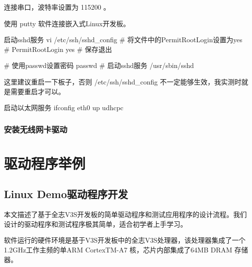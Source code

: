 \documentclass[lang=cn,newtx,10pt,scheme=chinese]{elegantbook}
\begin{document}
连接串口，波特率设置为 115200 。

使用 putty 软件连接嵌入式Linux开发板。

\begin{mycode}{启动sshd服务}
vi /etc/ssh/sshd_config
# 将文件中的PermitRootLogin设置为yes
# PermitRootLogin yes
# 保存退出

# 使用passwd设置密码
passwd
# 启动sshd服务
/usr/sbin/sshd
\end{mycode}

\begin{marker}
这里建议重启一下板子，否则 /etc/ssh/sshd\_config 不一定能够生效，我实测时就是需要重启才可以。
\end{marker}


\begin{mycode}{启动以太网服务}
ifconfig eth0 up
udhcpc
\end{mycode}

\section{安装无线网卡驱动}


\part{驱动程序举例}

\chapter{Linux Demo驱动程序开发}

本文描述了基于全志V3S开发板的简单驱动程序和测试应用程序的设计流程。我们设计的驱动程序和测试程序极其简单，适合初学者上手学习。

软件运行的硬件环境是基于V3S开发板中的全志V3S处理器，该处理器集成了一个1.2GHz工作主频的单ARM CortexTM-A7 核，芯片内部集成了64MB DRAM 存储器。
\end{document}
